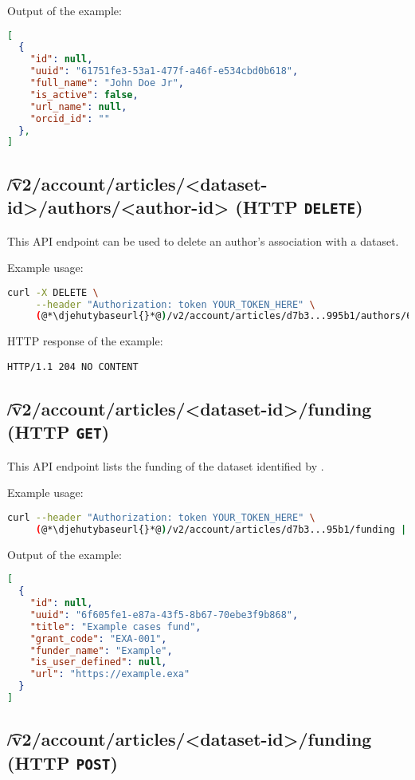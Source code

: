   Output of the example:
\begin{lstlisting}[language=JSON]
[
  {
    "id": null,
    "uuid": "61751fe3-53a1-477f-a46f-e534cbd0b618",
    "full_name": "John Doe Jr",
    "is_active": false,
    "url_name": null,
    "orcid_id": ""
  },
]
\end{lstlisting}

\subsection{\t{/v2/account/articles/<dataset-id>/authors/<author-id>} (HTTP \texttt{DELETE})}

  This API endpoint can be used to delete an author's association with a dataset.

  Example usage:
\begin{lstlisting}[language=bash]
curl -X DELETE \
     --header "Authorization: token YOUR_TOKEN_HERE" \
     (@*\djehutybaseurl{}*@)/v2/account/articles/d7b3...995b1/authors/6175...0b618
\end{lstlisting}

  HTTP response of the example:
\begin{lstlisting}
HTTP/1.1 204 NO CONTENT
\end{lstlisting}

\subsection{\t{/v2/account/articles/<dataset-id>/funding} (HTTP \texttt{GET})}

  This API endpoint lists the funding of the dataset identified by .

  Example usage:
\begin{lstlisting}[language=bash]
curl --header "Authorization: token YOUR_TOKEN_HERE" \
     (@*\djehutybaseurl{}*@)/v2/account/articles/d7b3...95b1/funding | jq
\end{lstlisting}

  Output of the example:
\begin{lstlisting}[language=JSON]
[
  {
    "id": null,
    "uuid": "6f605fe1-e87a-43f5-8b67-70ebe3f9b868",
    "title": "Example cases fund",
    "grant_code": "EXA-001",
    "funder_name": "Example",
    "is_user_defined": null,
    "url": "https://example.exa"
  }
]
\end{lstlisting}

\subsection{\t{/v2/account/articles/<dataset-id>/funding} (HTTP \texttt{POST})}
\label{sec:api-v2-articles-funding-post}

